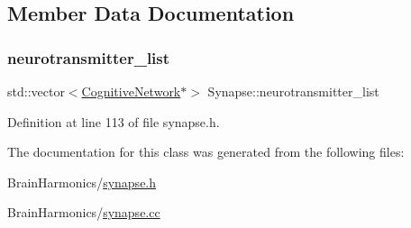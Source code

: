\subsection{Member Data Documentation}
\mbox{\label{class_synapse_ae1ab127b1a94b459f20aa5a5e9a23630}} 
\subsubsection{\texorpdfstring{neurotransmitter\+\_\+list}{neurotransmitter\_list}}
{\footnotesize\ttfamily std\+::vector$<$\mbox{\hyperlink{class_cognitive_network}{Cognitive\+Network}}$\ast$$>$ Synapse\+::neurotransmitter\+\_\+list\hspace{0.3cm}{\ttfamily [protected]}}



Definition at line 113 of file synapse.\+h.



The documentation for this class was generated from the following files\+:\begin{DoxyCompactItemize}
\item 
Brain\+Harmonics/\mbox{\hyperlink{synapse_8h}{synapse.\+h}}\item 
Brain\+Harmonics/\mbox{\hyperlink{synapse_8cc}{synapse.\+cc}}\end{DoxyCompactItemize}
